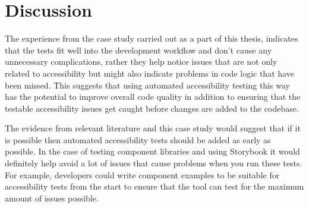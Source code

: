 \documentclass{master_thesis}
\begin{document}
\section{Discussion} \label{chap:conclusions}

The experience from the case study carried out as a part of this thesis, indicates that the tests fit well into the development workflow and don't cause any unnecessary complications, rather they help notice issues that are not only related to accessibility but might also indicate problems in code logic that have been missed. This suggests that using automated accessibility testing this way has the potential to improve overall code quality in addition to ensuring that the testable accessibility issues get caught before changes are added to the codebase.

The evidence from relevant literature and this case study would suggest that if it is possible then automated accessibility tests should be added as early as possible. In the case of testing component libraries and using Storybook it would definitely help avoid a lot of issues that cause problems when you run these tests. For example, developers could write component examples to be suitable for accessibility tests from the start to ensure that the tool can test for the maximum amount of issues possible.




\end{document}

